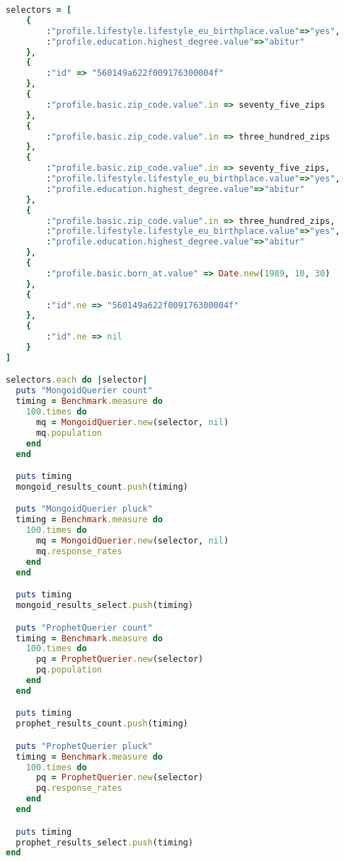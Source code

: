 \begin{appendix}
\begin{lstlisting}[language=Ruby]
selectors = [
    { 
        :"profile.lifestyle.lifestyle_eu_birthplace.value"=>"yes",
        :"profile.education.highest_degree.value"=>"abitur" 
    },
    { 
        :"id" => "560149a622f009176300004f" 
    },
    { 
        :"profile.basic.zip_code.value".in => seventy_five_zips 
    },
    { 
        :"profile.basic.zip_code.value".in => three_hundred_zips
    },
    { 
        :"profile.basic.zip_code.value".in => seventy_five_zips,
        :"profile.lifestyle.lifestyle_eu_birthplace.value"=>"yes", 
        :"profile.education.highest_degree.value"=>"abitur" 
    },
    { 
        :"profile.basic.zip_code.value".in => three_hundred_zips,
        :"profile.lifestyle.lifestyle_eu_birthplace.value"=>"yes", 
        :"profile.education.highest_degree.value"=>"abitur" 
    },
    { 
        :"profile.basic.born_at.value" => Date.new(1989, 10, 30) 
    },
    { 
        :"id".ne => "560149a622f009176300004f" 
    },
    { 
        :"id".ne => nil
    }
]

selectors.each do |selector|
  puts "MongoidQuerier count"
  timing = Benchmark.measure do
    100.times do
      mq = MongoidQuerier.new(selector, nil)
      mq.population
    end
  end

  puts timing
  mongoid_results_count.push(timing)

  puts "MongoidQuerier pluck"
  timing = Benchmark.measure do
    100.times do
      mq = MongoidQuerier.new(selector, nil)
      mq.response_rates
    end
  end

  puts timing
  mongoid_results_select.push(timing)

  puts "ProphetQuerier count"
  timing = Benchmark.measure do
    100.times do
      pq = ProphetQuerier.new(selector)
      pq.population
    end
  end

  puts timing
  prophet_results_count.push(timing)

  puts "ProphetQuerier pluck"
  timing = Benchmark.measure do
    100.times do
      pq = ProphetQuerier.new(selector)
      pq.response_rates
    end
  end

  puts timing
  prophet_results_select.push(timing)
end

\end{lstlisting}

\end{appendix}
